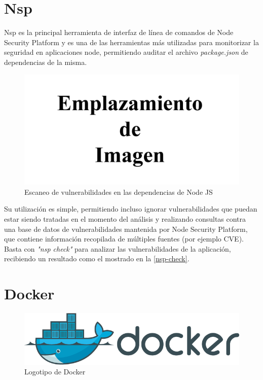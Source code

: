 
\section{Nsp}

Nsp es la principal herramienta de interfaz de línea de comandos de Node Security Platform y es una de las herramientas más utilizadas para monitorizar la seguridad en aplicaciones node, permitiendo auditar el archivo \textit{package.json} de dependencias de la misma.

\begin{figure}[htbp]
	\centering
	\includegraphics[width=0.80\linewidth]
	{figuras/emplazamiento-imagen.png}
	\caption{Escaneo de vulnerabilidades en las dependencias de Node JS}
	\label{nsp-check}
\end{figure}

Su utilización es simple, permitiendo incluso ignorar vulnerabilidades que puedan estar siendo tratadas en el momento del análisis y realizando consultas contra una base de datos de vulnerabilidades mantenida por Node Security Platform, que contiene información recopilada de múltiples fuentes (por ejemplo \gls{CVE}). Basta con \textit{"nsp check"} para analizar las vulnerabilidades de la aplicación, recibiendo un resultado como el mostrado en la \autoref{nsp-check}.


\section{Docker}

\begin{figure}[htbp]
	\centering
	\includegraphics[width=0.80\linewidth]
	{entorno/figuras/Docker.png}
	\caption{Logotipo de Docker}
	\label{docker-logo}
\end{figure}

